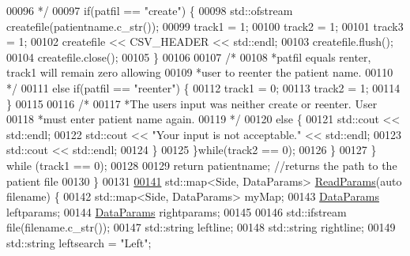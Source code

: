 \begin{DoxyCode}
00096 \textcolor{comment}{                     */}
00097                     \textcolor{keywordflow}{if}(patfil == \textcolor{stringliteral}{"create"}) \{
00098                         std::ofstream createfile(patientname.c\_str());
00099                         track1 = 1;
00100                         track2 = 1;
00101                         track3 = 1;
00102                         createfile << CSV\_HEADER << std::endl;
00103                         createfile.flush();
00104                         createfile.close();
00105                     \}
00106 
00107                     \textcolor{comment}{/*}
00108 \textcolor{comment}{                     *patfil equals renter, track1 will remain zero allowing}
00109 \textcolor{comment}{                     *user to reenter the patient name.}
00110 \textcolor{comment}{                     */}
00111                     \textcolor{keywordflow}{else} \textcolor{keywordflow}{if}(patfil == \textcolor{stringliteral}{"reenter"}) \{
00112                         track1 = 0;
00113                         track2 = 1;
00114                     \}
00115 
00116                     \textcolor{comment}{/*}
00117 \textcolor{comment}{                     *The users input was neither create or reenter. User}
00118 \textcolor{comment}{                     *must enter patient name again.}
00119 \textcolor{comment}{                     */}
00120                     \textcolor{keywordflow}{else} \{
00121                         std::cout << std::endl;
00122                         std::cout << \textcolor{stringliteral}{"Your input is not acceptable."} << std::endl;
00123                         std::cout << std::endl;
00124                     \}
00125                 \}\textcolor{keywordflow}{while}(track2 == 0);
00126             \}
00127         \} \textcolor{keywordflow}{while} (track1 == 0);
00128 
00129         \textcolor{keywordflow}{return} patientname; \textcolor{comment}{//returns the path to the patient file}
00130     \}
00131 
\hypertarget{fileio_8hpp_source_l00141}{}\hyperlink{namespaceavda_a46dc980b65ddfc24749ce25c1290e158}{00141}     std::map<Side, DataParams> \hyperlink{namespaceavda_a46dc980b65ddfc24749ce25c1290e158}{ReadParams}(\textcolor{keyword}{auto} filename) \{
00142         std::map<Side, DataParams> myMap;
00143         \hyperlink{structDataParams}{DataParams} leftparams;
00144         \hyperlink{structDataParams}{DataParams} rightparams;
00145 
00146         std::ifstream file(filename.c\_str());
00147         std::string leftline;
00148         std::string rightline;
00149         std::string leftsearch = \textcolor{stringliteral}{"Left"};

\end{DoxyCode}
